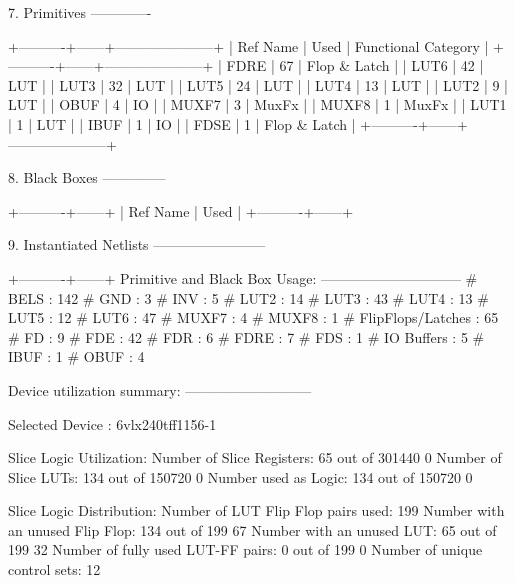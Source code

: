 \documentclass{article}
\begin{document}
7. Primitives
-------------

+----------+------+---------------------+
| Ref Name | Used | Functional Category |
+----------+------+---------------------+
| FDRE     |   67 |        Flop & Latch |
| LUT6     |   42 |                 LUT |
| LUT3     |   32 |                 LUT |
| LUT5     |   24 |                 LUT |
| LUT4     |   13 |                 LUT |
| LUT2     |    9 |                 LUT |
| OBUF     |    4 |                  IO |
| MUXF7    |    3 |               MuxFx |
| MUXF8    |    1 |               MuxFx |
| LUT1     |    1 |                 LUT |
| IBUF     |    1 |                  IO |
| FDSE     |    1 |        Flop & Latch |
+----------+------+---------------------+


8. Black Boxes
--------------

+----------+------+
| Ref Name | Used |
+----------+------+


9. Instantiated Netlists
------------------------

+----------+------+
\fi
\iffalse
Primitive and Black Box Usage:
------------------------------
# BELS                             : 142
#      GND                         : 3
#      INV                         : 5
#      LUT2                        : 14
#      LUT3                        : 43
#      LUT4                        : 13
#      LUT5                        : 12
#      LUT6                        : 47
#      MUXF7                       : 4
#      MUXF8                       : 1
# FlipFlops/Latches                : 65
#      FD                          : 9
#      FDE                         : 42
#      FDR                         : 6
#      FDRE                        : 7
#      FDS                         : 1
# IO Buffers                       : 5
#      IBUF                        : 1
#      OBUF                        : 4

Device utilization summary:
---------------------------

Selected Device : 6vlx240tff1156-1 


Slice Logic Utilization: 
 Number of Slice Registers:              65  out of  301440     0%
 Number of Slice LUTs:                  134  out of  150720     0%
    Number used as Logic:               134  out of  150720     0%

Slice Logic Distribution: 
 Number of LUT Flip Flop pairs used:    199
   Number with an unused Flip Flop:     134  out of    199    67%
   Number with an unused LUT:            65  out of    199    32%
   Number of fully used LUT-FF pairs:     0  out of    199     0%
   Number of unique control sets:        12
\end{document}
